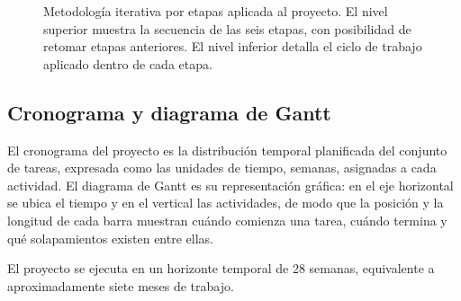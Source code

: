 \begin{figure}[H]
{%
}
\caption[Metodología iterativa por etapas aplicada al proyecto.]{Metodología iterativa por etapas aplicada al proyecto. El nivel superior muestra la secuencia de las seis etapas, con posibilidad de retomar etapas anteriores. El nivel inferior detalla el ciclo de trabajo aplicado dentro de cada etapa.}
\label{fig:metodologia}
\end{figure}

\subsection{Cronograma y diagrama de Gantt}
\label{subsec:gantt}

El cronograma del proyecto es la distribución temporal planificada del conjunto de tareas, expresada como las unidades de tiempo, semanas, asignadas a cada actividad. El diagrama de Gantt es su representación gráfica: en el eje horizontal se ubica el tiempo y en el vertical las actividades, de modo que la posición y la longitud de cada barra muestran cuándo comienza una tarea, cuándo termina y qué solapamientos existen entre ellas.

El proyecto se ejecuta en un horizonte temporal de 28 semanas, equivalente a aproximadamente siete meses de trabajo.

